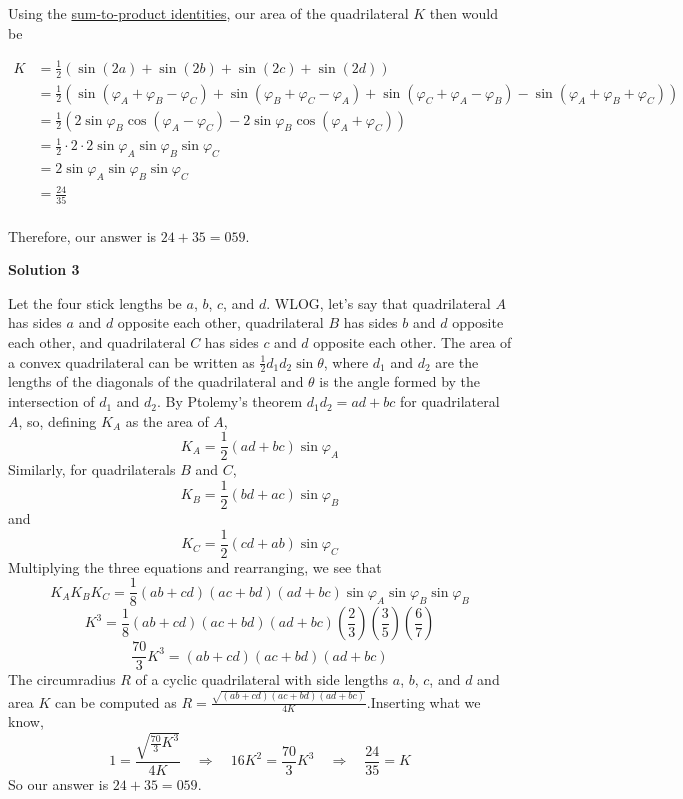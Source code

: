 \begin{enumerate}
 Using the \href{https://artofproblemsolving.com/wiki/index.php/Trigonometric\_identities\#Sum-to-product\_identities}{sum-to-product identities}, our area of the quadrilateral $K$ then would be

 
 \begin{align*}  K&=\frac{1}{2}(\sin(2a)+\sin(2b)+\sin(2c)+\sin(2d))\\ &=\frac{1}{2}(\sin(\varphi_A+\varphi_B-\varphi_C)+\sin(\varphi_B+\varphi_C-\varphi_A)+\sin(\varphi_C+\varphi_A-\varphi_B)-\sin(\varphi_A+\varphi_B+\varphi_C))\\ &=\frac{1}{2}(2\sin\varphi_B\cos(\varphi_A-\varphi_C)-2\sin\varphi_B\cos(\varphi_A+\varphi_C))\\ &=\frac{1}{2}\cdot2\cdot2\sin\varphi_A\sin\varphi_B\sin\varphi_C\\ &=2\sin\varphi_A\sin\varphi_B\sin\varphi_C\\ &=\frac{24}{35}\\ \end{align*}


 Therefore, our answer is $24+35=\boxed{059}$.

 



\textbf{Solution 3}

Let the four stick lengths be $a$, $b$, $c$, and $d$. WLOG, let’s say that quadrilateral $A$ has sides $a$ and $d$ opposite each other, quadrilateral $B$ has sides $b$ and $d$ opposite each other, and quadrilateral $C$ has sides $c$ and $d$ opposite each other. The area of a convex quadrilateral can be written as $\frac{1}{2} d_1 d_2 \sin{\theta}$, where $d_1$ and $d_2$ are the lengths of the diagonals of the quadrilateral and $\theta$ is the angle formed by the intersection of $d_1$ and $d_2$. By Ptolemy's theorem $d_1 d_2 = ad+bc$ for quadrilateral $A$, so, defining $K_A$ as the area of $A$,
 \[K_A = \frac{1}{2} (ad+bc)\sin{\varphi_A}\]Similarly, for quadrilaterals $B$ and $C$,
 \[K_B = \frac{1}{2} (bd+ac)\sin{\varphi_B}\]and
 \[K_C = \frac{1}{2} (cd+ab)\sin{\varphi_C}\]Multiplying the three equations and rearranging, we see that
 \[K_A K_B K_C = \frac{1}{8} (ab+cd)(ac+bd)(ad+bc)\sin{\varphi_A}\sin{\varphi_B}\sin{\varphi_B}\]
 \[K^3 = \frac{1}{8} (ab+cd)(ac+bd)(ad+bc)\left(\frac{2}{3}\right) \left(\frac{3}{5}\right) \left(\frac{6}{7}\right)\]
 \[\frac{70}{3}K^3 = (ab+cd)(ac+bd)(ad+bc)\]The circumradius $R$ of a cyclic quadrilateral with side lengths $a$, $b$, $c$, and $d$ and area $K$ can be computed as $R = \frac{\sqrt{(ab+cd)(ac+bd)(ad+bc)}}{4K}$.Inserting what we know,
 \[1 = \frac{\sqrt{\frac{70}{3}K^3}}{4K}\quad \Rightarrow \quad 16K^2 = \frac{70}{3}K^3\quad \Rightarrow \quad \frac{24}{35} = K\]So our answer is $24 + 35 = \boxed{059}$.


\end{enumerate}
